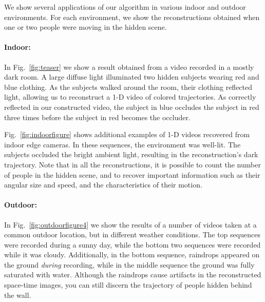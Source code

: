 We show several applications of our algorithm in various indoor and outdoor environments. For each environment, we show the reconstructions obtained when one or two people were moving in the hidden scene. 

\vspace{-.1in}
\paragraph{Indoor:}
In Fig.~\ref{fig:teaser} we show a result obtained from a video recorded in a mostly dark room. A large diffuse light illuminated two hidden subjects wearing red and blue clothing. As the subjects walked around the room, their clothing reflected light, allowing us to reconstruct a 1-D video of colored trajectories. As correctly reflected in our constructed video, the subject in blue occludes the subject in red three times before the subject in red becomes the occluder. 

Fig.~\ref{fig:indoorfigure} shows additional examples of 1-D videos recovered from indoor edge cameras. In these sequences, 
the environment was well-lit. The subjects
occluded the bright ambient light, resulting in the reconstruction's dark trajectory. Note that in all the reconstructions, it is possible to count the number of people in the hidden scene, and to recover important information such as their angular size and speed, and the characteristics of their motion.

\vspace{-.1in}
\paragraph{Outdoor: }
In Fig.~\ref{fig:outdoorfigure4} we show the results of a number of videos taken at a common outdoor location, but in different weather conditions. The top sequences were recorded during a sunny day, while the bottom two sequences were recorded while it was cloudy. Additionally, in the bottom sequence, raindrops appeared on the ground {\it during} recording, while in the middle sequence the ground was fully saturated with water.  
Although the raindrops cause artifacts in the reconstructed space-time images, you can still discern the trajectory of people hidden behind the wall. 






